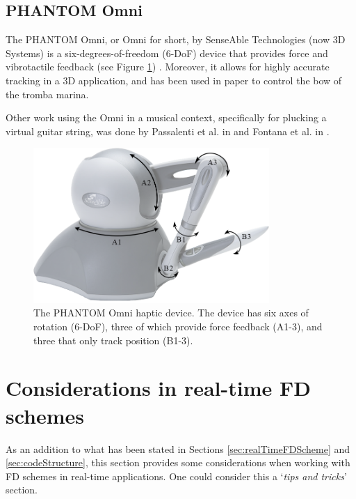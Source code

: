 \subsection{PHANTOM Omni}\label{sec:phantomOmni}
The PHANTOM Omni, or Omni for short, by SenseAble Technologies (now 3D Systems) is a six-degrees-of-freedom (6-DoF) device that provides force and vibrotactile feedback (see Figure \ref{fig:omni}) \cite{OmniAPI2018}. Moreover, it allows for highly accurate tracking in a 3D application, and has been used in paper \citeP[E] to control the bow of the tromba marina. 

Other work using the Omni in a musical context, specifically for plucking a virtual guitar string, was done by Passalenti et al. in \cite{passalenti2019a, passalenti2019b} and Fontana et al. in \cite{Fontana2020}.

\begin{figure}[h]\includegraphics[width=0.8\textwidth]{figures/contributions/realtime/omniSchematic.png}
    \centering
      \caption{The PHANTOM Omni haptic device. The device has six axes of rotation (6-DoF), three of which provide force feedback (A1-3), and three that only track position (B1-3). \label{fig:omni}}
\end{figure}

\section{Considerations in real-time FD schemes}
As an addition to what has been stated in Sections \ref{sec:realTimeFDScheme} and \ref{sec:codeStructure}, this section provides some considerations when working with FD schemes in real-time applications. One could consider this a `\textit{tips and tricks}' section. 

